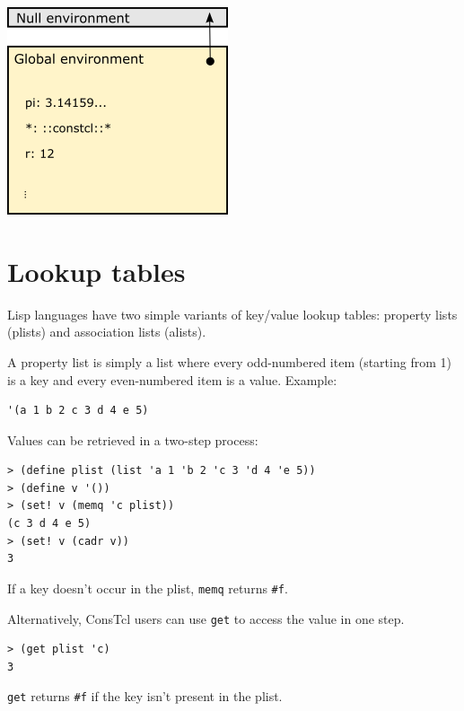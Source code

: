 \documentclass[twoside,9pt]{report}
\begin{document}
\includegraphics{images/env1.png}

\chapter{Lookup tables}
\label{lookup-tables}

Lisp languages have two simple variants of key/value lookup tables: property lists (plists) and association lists (alists).


A property list is simply a list where every odd-numbered item (starting from 1) is a key and every even-numbered item is a value. Example:

\noindent\makebox[\linewidth]{\rule{\linewidth}{0.4pt}}
\begin{lstlisting}
'(a 1 b 2 c 3 d 4 e 5)
\end{lstlisting}
\noindent\makebox[\linewidth]{\rule{\linewidth}{0.4pt}}

Values can be retrieved in a two-step process:

\noindent\makebox[\linewidth]{\rule{\linewidth}{0.4pt}}
\begin{lstlisting}
> (define plist (list 'a 1 'b 2 'c 3 'd 4 'e 5))
> (define v '())
> (set! v (memq 'c plist))
(c 3 d 4 e 5)
> (set! v (cadr v))
3
\end{lstlisting}
\noindent\makebox[\linewidth]{\rule{\linewidth}{0.4pt}}

If a key doesn't occur in the plist, \texttt{memq} returns \texttt{\#f}.


Alternatively, ConsTcl users can use \texttt{get} to access the value in one step.

\noindent\makebox[\linewidth]{\rule{\linewidth}{0.4pt}}
\begin{lstlisting}
> (get plist 'c)
3
\end{lstlisting}
\noindent\makebox[\linewidth]{\rule{\linewidth}{0.4pt}}

\texttt{get} returns \texttt{\#f} if the key isn't present in the plist.
\end{document}
